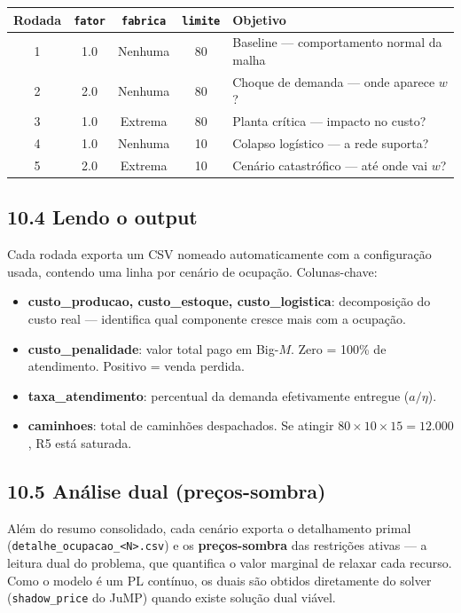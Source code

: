 \documentclass[12pt, a4paper]{article}
\begin{document}
\begin{center}
\renewcommand{\arraystretch}{1.4}
\begin{tabular}{c c c c p{5.5cm}}
  \toprule
  Rodada & \texttt{fator} & \texttt{fabrica} & \texttt{limite} & Objetivo \\
  \midrule
  1 & 1.0 & Nenhuma & 80 & Baseline --- comportamento normal da malha \\
  2 & 2.0 & Nenhuma & 80 & Choque de demanda --- onde aparece $w$? \\
  3 & 1.0 & Extrema & 80 & Planta cr\'{i}tica --- impacto no custo? \\
  4 & 1.0 & Nenhuma & 10 & Colapso log\'{i}stico --- a rede suporta? \\
  5 & 2.0 & Extrema & 10 & Cen\'{a}rio catastrófico --- at\'{e} onde vai $w$? \\
  \bottomrule
\end{tabular}
\end{center}

\subsection*{10.4 Lendo o output}

Cada rodada exporta um CSV nomeado automaticamente com a configura\c{c}\~{a}o usada,
contendo uma linha por cen\'{a}rio de ocupa\c{c}\~{a}o. Colunas-chave:

\begin{itemize}[leftmargin=1.5em, itemsep=3pt]
  \item \textbf{custo\_producao, custo\_estoque, custo\_logistica}: decomposi\c{c}\~{a}o do custo real
    --- identifica qual componente cresce mais com a ocupa\c{c}\~{a}o.
  \item \textbf{custo\_penalidade}: valor total pago em Big-$M$.
    Zero = 100\% de atendimento. Positivo = venda perdida.
  \item \textbf{taxa\_atendimento}: percentual da demanda efetivamente entregue ($a / \eta$).
  \item \textbf{caminhoes}: total de caminh\~{o}es despachados. Se atingir
    $80 \times 10 \times 15 = 12.000$, R5 est\'{a} saturada.
\end{itemize}

\subsection*{10.5 An\'{a}lise dual (pre\c{c}os-sombra)}

Al\'{e}m do resumo consolidado, cada cen\'{a}rio exporta o detalhamento primal
(\texttt{detalhe\_ocupacao\_<N>.csv}) e os \textbf{pre\c{c}os-sombra} das restri\c{c}\~{o}es
ativas --- a leitura dual do problema, que quantifica o valor marginal de relaxar cada
recurso. Como o modelo \'{e} um PL cont\'{i}nuo, os duais s\~{a}o obtidos diretamente do
solver (\texttt{shadow\_price} do JuMP) quando existe solu\c{c}\~{a}o dual vi\'{a}vel.
\end{document}
